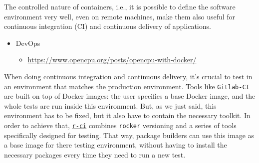 \label{cicd}

The controlled nature of containers, i.e., it is possible to define the
software environment very well, even on remote machines, make them also
useful for continuous integration (CI) and continuous delivery of
applications.

\begin{itemize}
\tightlist
\item
  DevOps

  \begin{itemize}
  \tightlist
  \item
    \url{https://www.opencpu.org/posts/opencpu-with-docker/}
  \end{itemize}
\end{itemize}

When doing continuous integration and continuous delivery, it's crucial
to test in an environment that matches the production environment. Tools
like \texttt{Gitlab-CI} are built on top of Docker images: the user
specifies a base Docker image, and the whole tests are run inside this
environment. But, as we just said, this environment has to be fixed, but
it also have to contain the necessary toolkit. In order to achieve that,
\href{https://github.com/ColinFay/r-ci}{\texttt{r-ci}} combines
\texttt{rocker} versioning and a series of tools specifically designed
for testing. That way, package builders can use this image as a base
image for there testing environment, without having to install the
necessary packages every time they need to run a new test.

